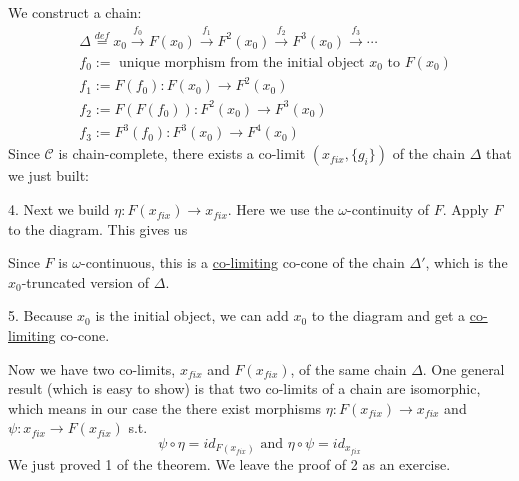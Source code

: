 \documentclass{report}[12pt]
\begin{document}
We construct a chain:
\begin{align*}
  &\Delta \stackrel{def}{=} x_0 \stackrel{f_0}{\rightarrow} F(x_0) \stackrel{f_1}{\rightarrow} F^2(x_0) \stackrel{f_2}{\rightarrow} F^3 (x_0) \stackrel{f_3}{\rightarrow} \cdots \\
  &f_0:= \text{ unique morphism from the initial object }x_0 \text{ to }F(x_0) \\
  &f_1:= F(f_0):F(x_0)\rightarrow F^2(x_0) \\
  &f_2:= F(F(f_0)):F^2(x_0) \rightarrow F^3(x_0) \\
  &f_3:= F^3(f_0):F^3(x_0) \rightarrow F^4(x_0)
\end{align*}
Since $\mathcal{C}$ is chain-complete, there exists a co-limit $(x_{fix}, \{g_i\})$ of the chain $\Delta$ that we just built:
{\center
{}
\par}

4. Next we build $\eta:F(x_{fix}) \rightarrow x_{fix}$. Here we use the $\omega$-continuity of $F$. Apply $F$ to the diagram. This gives us
{\center
{}
\par}
Since $F$ is $\omega$-continuous, this is a \underline{co-limiting} co-cone of the chain $\Delta'$, which is the $x_0$-truncated version of $\Delta$.

5. Because $x_0$ is the initial object, we can add $x_0$ to the diagram and get a \underline{co-limiting} co-cone.
{\center
{}
\par}
Now we have two co-limits, $x_{fix}$ and $F(x_{fix})$, of the same chain $\Delta$. One general result (which is easy to show) is that two co-limits of a chain are isomorphic, which means in our case the there exist morphisms $\eta:F(x_{fix}) \rightarrow x_{fix}$ and $\psi:x_{fix} \rightarrow F(x_{fix})$ s.t. \[\psi \circ \eta = id_{F(x_{fix})}\text{ and }\eta \circ \psi = id_{x_{fix}}\]
We just proved 1 of the theorem. We leave the proof of 2 as an exercise.
\end{document}
